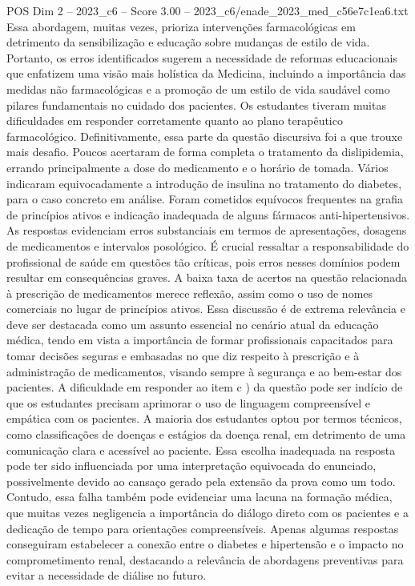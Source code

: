 \begin{textsample}{POS Dim 2 – 2023\_c6 – Score 3.00 – 2023\_c6/enade\_2023\_med\_c56e7c1ea6.txt}
Essa abordagem, muitas vezes, prioriza intervenções farmacológicas em detrimento da sensibilização e educação sobre mudanças de estilo de vida.
Portanto, os erros identificados sugerem a necessidade de reformas educacionais que enfatizem uma visão mais holística da Medicina, incluindo a importância das medidas não farmacológicas e a promoção de um estilo de vida saudável como pilares fundamentais no cuidado dos pacientes.
Os estudantes tiveram muitas dificuldades em responder corretamente quanto ao plano terapêutico farmacológico.
Definitivamente, essa parte da questão discursiva foi a que trouxe mais desafio.
Poucos acertaram de forma completa o tratamento da dislipidemia, errando principalmente a dose do medicamento e o horário de tomada.
Vários indicaram equivocadamente a introdução de insulina no tratamento do diabetes, para o caso concreto em análise.
Foram cometidos equívocos frequentes na grafia de princípios ativos e indicação inadequada de alguns fármacos anti-hipertensivos.
As respostas evidenciam erros substanciais em termos de apresentações, dosagens de medicamentos e intervalos posológico.
É crucial ressaltar a responsabilidade do profissional de saúde em questões tão críticas, pois erros nesses domínios podem resultar em consequências graves.
A baixa taxa de acertos na questão relacionada à prescrição de medicamentos merece reflexão, assim como o uso de nomes comerciais no lugar de princípios ativos.
Essa discussão é de extrema relevância e deve ser destacada como um assunto essencial no cenário atual da educação médica, tendo em vista a importância de formar profissionais capacitados para tomar decisões seguras e embasadas no que diz respeito à prescrição e à administração de medicamentos, visando sempre à segurança e ao bem-estar dos pacientes.
A dificuldade em responder ao item c ) da questão pode ser indício de que os estudantes precisam aprimorar o uso de linguagem compreensível e empática com os pacientes.
A maioria dos estudantes optou por termos técnicos, como classificações de doenças e estágios da doença renal, em detrimento de uma comunicação clara e acessível ao paciente.
Essa escolha inadequada na resposta pode ter sido influenciada por uma interpretação equivocada do enunciado, possivelmente devido ao cansaço gerado pela extensão da prova como um todo.
Contudo, essa falha também pode evidenciar uma lacuna na formação médica, que muitas vezes negligencia a importância do diálogo direto com os pacientes e a dedicação de tempo para orientações compreensíveis.
Apenas algumas respostas conseguiram estabelecer a conexão entre o diabetes e hipertensão e o impacto no comprometimento renal, destacando a relevância de abordagens preventivas para evitar a necessidade de diálise no futuro.

\end{textsample}
